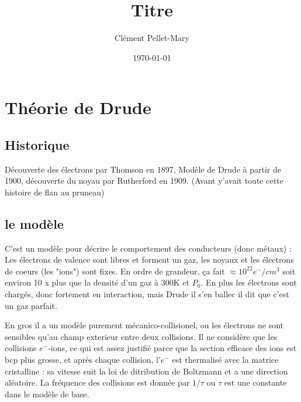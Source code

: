 \documentclass[a4paper]{report}
\title{Titre}
\author{Clément Pellet-Mary}
\date\today
\begin{document}
\chapter{Théorie de Drude}
  \section{Historique}
  Découverte des électrons par Thomson en 1897, Modèle de Drude à partir de 1900, découverte du noyau par Rutherford en 1909. (Avant y'avait toute cette histoire de flan au pruneau)
  \section{le modèle}
  C'est un modèle pour décrire le comportement des conducteurs (donc métaux) : Les électrons de valence sont libres et forment un gaz, les noyaux et les électrons de coeurs (les "ions") sont fixes. En ordre de grandeur, ça fait $\approx 10^{22} e^-/cm^3$ soit environ 10 x plus que la densité d'un gaz à 300K et $P_0$. En plus les électrons sont chargés, donc fortement en interaction, mais Drude il s'en ballec il dit que c'est un gaz parfait.
  
  En gros il a un modèle purement mécanico-collisionel, ou les électrons ne sont sensibles qu'au champ exterieur entre deux collisions. Il ne considère que les collisions $e^-$-ions, ce qui est assez justifié parce que la section efficace des ions est bcp plus grosse, et après chaque collision, l'$e^-$ est thermalisé avec la matrice cristalline : sa vitesse suit la loi de ditribution de Boltzmann et a une direction aléatoire. La fréquence des collisions est donnée par $1/\tau$ ou $\tau$ est une constante dans le modèle de base.
\end{document}
